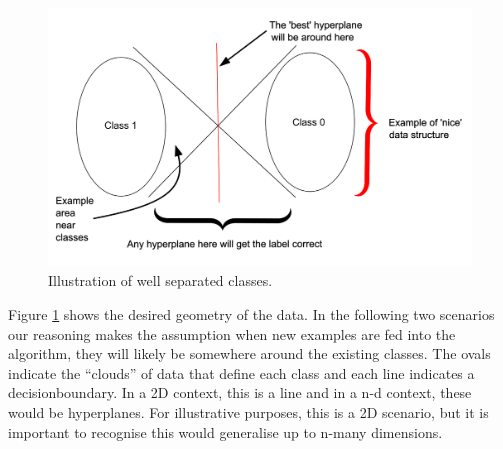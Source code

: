 
\begin{figure}[H]
\centering
\includegraphics[width=\textwidth]{figs/hyperplanes_good_classes.png}
\caption{Illustration of well separated classes.} 
\label{fig:good_sep_classes} %
\end{figure}

Figure \ref{fig:good_sep_classes} shows the desired geometry of the data. In the following two scenarios our reasoning makes the assumption when new examples are fed into the algorithm, they will likely be somewhere around the existing classes. The ovals indicate the \enquote{clouds} of data that define each class and each line indicates a \gls{decisionboundary}. In a 2D context, this is a line and in a n-d context, these would be \gls{hyperplane}s.  For illustrative purposes, this is a 2D scenario, but it is important to recognise this would generalise up to n-many dimensions.  %

